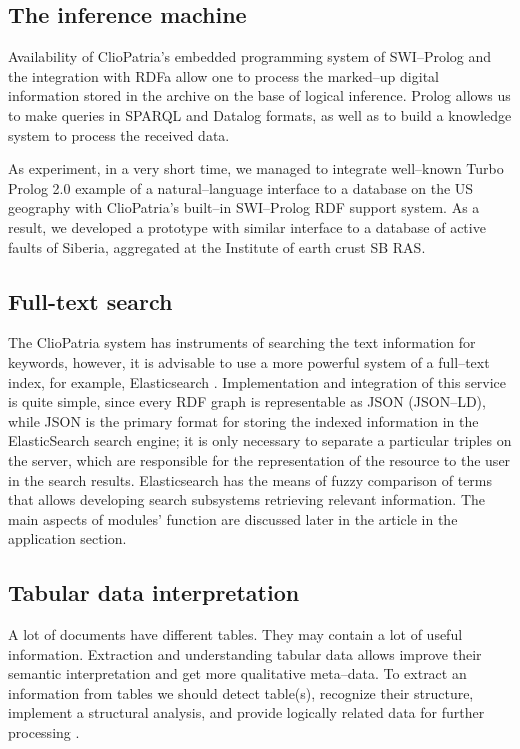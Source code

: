 \documentclass[conference,a4paper]{IEEEtran}
\begin{document}
\subsection{The inference machine}

Availability of ClioPatria's embedded programming system of SWI--Prolog
\cite{b10} and the integration with RDFa allow one to process the
marked--up digital information stored in the archive on the base of
logical inference. Prolog allows us to make queries in SPARQL and
Datalog formats, as well as to build a knowledge system to process the
received data.

As experiment, in a very short time, we managed to integrate well--known
Turbo Prolog 2.0 example of a natural--language interface to a database
on the US geography with ClioPatria's built--in SWI--Prolog RDF support
system. As a result, we developed a prototype with similar interface to
a database of active faults of Siberia, aggregated at the Institute of
earth crust SB RAS.


\subsection{Full-text search}

The ClioPatria system has instruments of searching the text information
for keywords, however, it is advisable to use a more powerful system of
a full--text index, for example, Elasticsearch \cite{b13}. Implementation
and integration of this service is quite simple, since every RDF graph
is representable as JSON (JSON--LD), while JSON is the primary format for
storing the indexed information in the ElasticSearch search engine; it
is only necessary to separate a particular triples on the server, which
are responsible for the representation of the resource to the user in
the search results. Elasticsearch has the means of fuzzy comparison of
terms that allows developing search subsystems retrieving relevant
information. The main aspects of modules' function are discussed later
in the article in the application section.


\subsection{Tabular data interpretation}

A lot of documents have different tables. They may contain a lot of useful information. Extraction and understanding tabular data allows improve their semantic interpretation and get more qualitative meta--data. To extract an information from tables we should detect table(s), recognize their structure, implement a structural analysis, and provide logically related data for further processing \cite{Shigarov_2017}.
\end{document}

